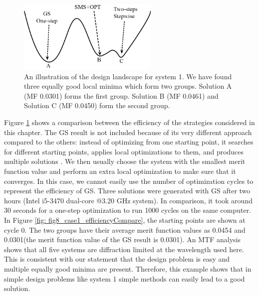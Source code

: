 \begin{figure}[h!]
    \centering
    \includegraphics[width=0.6\textwidth]{chapter-5/figures/Fig7_Landscape_illustration_sys1-2.png}
    \caption{An illustration of the design landscape for system 1. We have found three equally good local minima which form two groups. Solution A (MF 0.0301) forms the first group. Solution B (MF 0.0461) and Solution C (MF 0.0450) form the second group.}
    \label{fig: fig7_landscape_illus}
\end{figure}


Figure \ref{fig: fig7_landscape_illus} shows a comparison between the efficiency of the strategies considered in this chapter. The GS result is not included because of its very different approach compared to the others: instead of optimizing from one starting point, it searches for different starting points, applies local optimizations to them, and produces multiple solutions \cite{codevmanual}. We then usually choose the system with the smallest merit function value and perform an extra local optimization to make sure that it converges. In this case, we cannot easily use the number of optimization cycles to represent the efficiency of GS. Three solutions were generated with GS after two hours (Intel i5-3470 dual-core @3.20 GHz system). In comparison, it took around 30 seconds for a one-step optimization to run 1000 cycles on the same computer. In Figure \ref{fig: fig8_case1_efficiencyCompare}, the starting points are shown at cycle 0. The two groups have their average merit function values as 0.0454 and 0.0301(the merit function value of the GS result is 0.0301). An MTF analysis shows that all five systems are diffraction limited at the wavelength used here. This is consistent with our statement that the design problem is easy and multiple equally good minima are present. Therefore, this example shows that in simple design problems like system 1 simple methods can easily lead to a good solution. 

